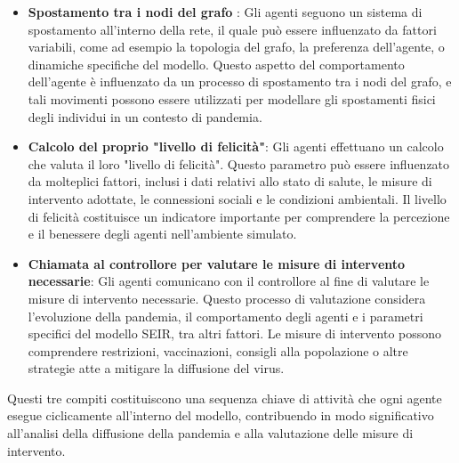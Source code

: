 \begin{itemize}
	\item \textbf{Spostamento tra i nodi del grafo} \cite{Ding2021}: 
	Gli agenti seguono un sistema di spostamento all'interno della rete, 
	il quale può essere influenzato da fattori variabili, 
	come ad esempio la topologia del grafo, la preferenza dell'agente, 
	o dinamiche specifiche del modello. Questo aspetto del 
	comportamento dell'agente è influenzato da un processo di 
	spostamento tra i nodi del grafo, e tali movimenti possono essere 
	utilizzati per modellare gli spostamenti fisici degli individui in 
	un contesto di pandemia.
	\item \textbf{Calcolo del proprio "livello di felicità"}: Gli agenti 
	effettuano un calcolo che valuta il loro "livello di felicità". 
	Questo parametro può essere influenzato da molteplici fattori, 
	inclusi i dati relativi allo stato di salute, le misure di 
	intervento adottate, le connessioni sociali e le condizioni 
	ambientali. Il livello di felicità costituisce un indicatore 
	importante per comprendere la percezione e il benessere degli 
	agenti nell'ambiente simulato.
	\item \textbf{Chiamata al controllore per valutare le misure 
	di intervento necessarie}: Gli agenti comunicano con il controllore 
	al fine di valutare le misure di intervento necessarie. 
	Questo processo di valutazione considera l'evoluzione della pandemia, 
	il comportamento degli agenti e i parametri specifici del modello SEIR, 
	tra altri fattori. Le misure di intervento possono comprendere 
	restrizioni, vaccinazioni, consigli alla popolazione o altre 
	strategie atte a mitigare la diffusione del virus.
\end{itemize}

Questi tre compiti costituiscono una sequenza chiave di attività che 
ogni agente esegue ciclicamente all'interno del modello, contribuendo 
in modo significativo all'analisi della diffusione della pandemia e 
alla valutazione delle misure di intervento.

